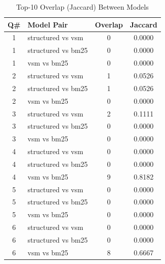 \begin{table}[h]
\centering
\caption{Top-10 Overlap (Jaccard) Between Models}
\label{tab:overlap}
\begin{tabular}{clcc}
\toprule
Q\# & Model Pair & Overlap & Jaccard \\
\midrule
1 & structured vs vsm & 0 & 0.0000 \\
1 & structured vs bm25 & 0 & 0.0000 \\
1 & vsm vs bm25 & 0 & 0.0000 \\
\midrule
2 & structured vs vsm & 1 & 0.0526 \\
2 & structured vs bm25 & 1 & 0.0526 \\
2 & vsm vs bm25 & 0 & 0.0000 \\
\midrule
3 & structured vs vsm & 2 & 0.1111 \\
3 & structured vs bm25 & 0 & 0.0000 \\
3 & vsm vs bm25 & 0 & 0.0000 \\
\midrule
4 & structured vs vsm & 0 & 0.0000 \\
4 & structured vs bm25 & 0 & 0.0000 \\
4 & vsm vs bm25 & 9 & 0.8182 \\
\midrule
5 & structured vs vsm & 0 & 0.0000 \\
5 & structured vs bm25 & 0 & 0.0000 \\
5 & vsm vs bm25 & 0 & 0.0000 \\
\midrule
6 & structured vs vsm & 0 & 0.0000 \\
6 & structured vs bm25 & 0 & 0.0000 \\
6 & vsm vs bm25 & 8 & 0.6667 \\
\bottomrule
\end{tabular}
\end{table}
